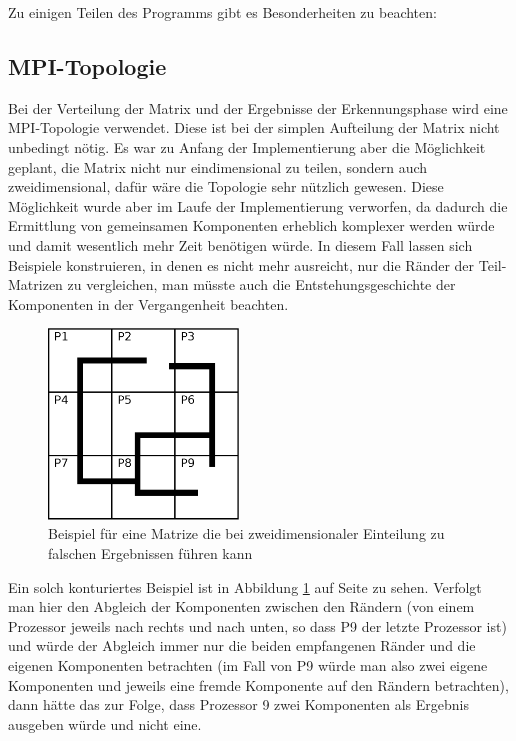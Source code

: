 Zu einigen Teilen des Programms gibt es Besonderheiten zu beachten:

\subsection{MPI-Topologie}

Bei der Verteilung der Matrix und der Ergebnisse der Erkennungsphase wird eine MPI-Topologie verwendet. Diese ist bei der simplen Aufteilung der Matrix nicht unbedingt nötig. Es war zu Anfang der Implementierung aber die Möglichkeit geplant, die Matrix nicht nur eindimensional zu teilen, sondern auch zweidimensional, dafür wäre die Topologie sehr nützlich gewesen. Diese Möglichkeit wurde aber im Laufe der Implementierung verworfen, da dadurch die Ermittlung von gemeinsamen Komponenten erheblich komplexer werden würde und damit wesentlich mehr Zeit benötigen würde. In diesem Fall lassen sich Beispiele konstruieren, in denen es nicht mehr ausreicht, nur die Ränder der Teil-Matrizen zu vergleichen, man müsste auch die Entstehungsgeschichte der Komponenten in der Vergangenheit beachten.

\begin{figure}[tbhp]
	\centering
	\includegraphics[width=0.45\textwidth]{images/bordercompare_illegal}
	\caption{Beispiel für eine Matrize die bei zweidimensionaler Einteilung zu falschen Ergebnissen führen kann}
	\label{fig:bcomp_illegal}
\end{figure}

Ein solch konturiertes Beispiel ist in Abbildung \ref{fig:bcomp_illegal} auf Seite \pageref{fig:bcomp_illegal} zu sehen. Verfolgt man hier den Abgleich der Komponenten zwischen den Rändern (von einem Prozessor jeweils nach rechts und nach unten, so dass P9 der letzte Prozessor ist) und würde der Abgleich immer nur die beiden empfangenen Ränder und die eigenen Komponenten betrachten (im Fall von P9 würde man also zwei eigene Komponenten und jeweils eine fremde Komponente auf den Rändern betrachten), dann hätte das zur Folge, dass Prozessor 9 zwei Komponenten als Ergebnis ausgeben würde und nicht eine.

